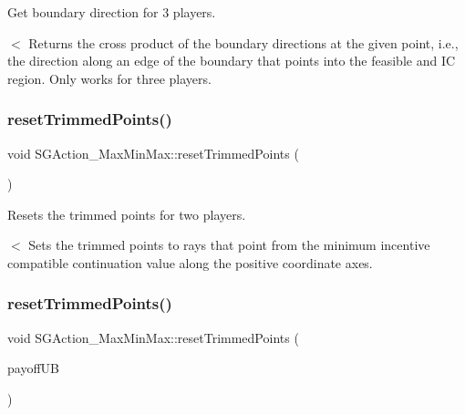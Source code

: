 Get boundary direction for 3 players. 

$<$ Returns the cross product of the boundary directions at the given point, i.\+e., the direction along an edge of the boundary that points into the feasible and IC region. Only works for three players. \mbox{\label{classSGAction__MaxMinMax_ae7e17727071ae5257c6f28bb5eeb1972}} 
\subsubsection{\texorpdfstring{reset\+Trimmed\+Points()}{resetTrimmedPoints()}\hspace{0.1cm}{\footnotesize\ttfamily [1/2]}}
{\footnotesize\ttfamily void S\+G\+Action\+\_\+\+Max\+Min\+Max\+::reset\+Trimmed\+Points (\begin{DoxyParamCaption}{ }\end{DoxyParamCaption})}



Resets the trimmed points for two players. 

$<$ Sets the trimmed points to rays that point from the minimum incentive compatible continuation value along the positive coordinate axes. \mbox{\label{classSGAction__MaxMinMax_a76943bc1614a4e3abe153ca6b12faf7c}} 
\subsubsection{\texorpdfstring{reset\+Trimmed\+Points()}{resetTrimmedPoints()}\hspace{0.1cm}{\footnotesize\ttfamily [2/2]}}
{\footnotesize\ttfamily void S\+G\+Action\+\_\+\+Max\+Min\+Max\+::reset\+Trimmed\+Points (\begin{DoxyParamCaption}\item[{const \hyperlink{classSGPoint}{S\+G\+Point} \&}]{payoff\+UB }\end{DoxyParamCaption})}



